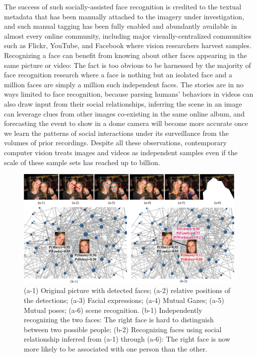 The success of such socially-assisted face recognition is credited to the textual metadata that has been manually attached to the imagery under investigation, and such manual tagging has been fully enabled and abundantly available in almost every online community, including major visually-centralized communities such as Flickr, YouTube, and Facebook where vision researchers harvest samples.  Recognizing a face can benefit from knowing about other faces appearing in the same picture or video: The fact is too obvious to be harnessed by the majority of face recognition research where a face is nothing but an isolated face and a million faces are simply a million such independent faces. The stories are in no ways limited to face recognition, because parsing humans' behaviors in videos can also draw input from their social relationships, inferring the scene in an image can leverage clues from other images co-existing in the same online album, and forecasting the event to show in a dome camera will become more accurate once we learn the patterns of social interactions under its surveillance from the volumes of prior recordings. Despite all these observations, contemporary computer vision treats images and videos as independent samples even if the scale of these sample sets has reached up to billion.

\begin{figure}[t!]
\begin{center}
\includegraphics[width=\columnwidth]{intro}
\end{center}
\vspace{-0.25in} \caption{\captionsize 
(a-1) Original picture with detected faces; (a-2) relative positions of the detections; (a-3) Facial expressions; (a-4) Mutual Gazes; (a-5) Mutual poses; (a-6) scene recognition. (b-1) Independently recognizing the two faces: The right face is hard to distinguish between two possible people; (b-2) Recognizing faces using social relationship inferred from (a-1) through (a-6): The right face is now more likely to be associated with one person than the other. \label{fig:intro}\afterfigspace}
\end{figure}

